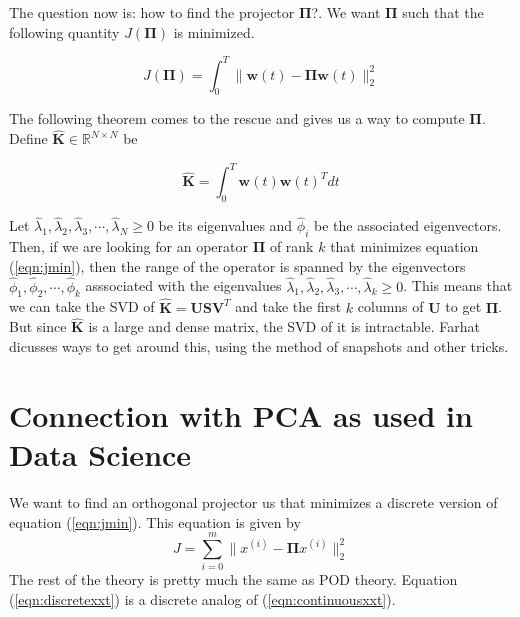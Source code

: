 \documentclass{article}
\newcommand{\beq}{\begin{equation}}
\newcommand{\eeq}{\end{equation}}
\newcommand{\bw}{{\mathbf{w}}}
\newcommand{\bPi}{\mathbf{\Pi}}
\newcommand{\bK}{{\mathbf{K}}}
\newcommand{\bU}{{\mathbf{U}}}
\newcommand{\bS}{{\mathbf{S}}}
\newcommand{\bV}{{\mathbf{V}}}
\begin{document}
The question now is: how to find the projector $\bPi$?. We want $\bPi$ such that the following quantity $J(\bPi)$ is minimized.

\beq
\label{eqn:jmin}
J(\bPi)=\int_{0}^{T} \|\bw(t)-\bPi\bw(t)\|_2^2
\eeq

The following theorem comes to the rescue and gives us a way to compute $\bPi$. Define $\hat{\bK}\in \mathbb{R}^{N\times{N}}$ be

\beq
\label{eqn:continuousxxt}
\hat{\bK} = \int_{0}^{T} \bw(t)\bw(t)^T dt
\eeq

Let $\hat{\lambda}_1,\hat{\lambda}_2,\hat{\lambda}_3,\cdots,\hat{\lambda}_N \ge 0$ be its eigenvalues and $\hat{\phi}_i$ be the associated eigenvectors. Then, if we are looking for an operator $\bPi$ of rank $k$ that minimizes equation (\ref{eqn:jmin}), then the range of the operator is spanned by the eigenvectors $\hat{\phi}_1,\hat{\phi}_2,\cdots,\hat{\phi}_k$ asssociated with the eigenvalues $\hat{\lambda}_1,\hat{\lambda}_2,\hat{\lambda}_3,\cdots,\hat{\lambda}_k \ge 0$. This means that we can take the SVD of $\hat{\bK}=\bU\bS\bV^T$ and take the first $k$ columns of $\bU$ to get $\bPi$. But since $\hat{\bK}$ is a large and dense matrix, the SVD of it is intractable. Farhat dicusses ways to get around this, using the method of snapshots and other tricks.

\section{Connection with PCA as used in Data Science}
We want to find an orthogonal projector us that minimizes a discrete version of equation (\ref{eqn:jmin}). This equation is given by
\beq
J = \sum_{i=0}^{m}\|x^{(i)}-\bPi{x^{(i)}}\|_2^2
\eeq
The rest of the theory is pretty much the same as POD theory. Equation (\ref{eqn:discretexxt}) is a discrete analog of (\ref{eqn:continuousxxt}).
%
%
%
\end{document}
